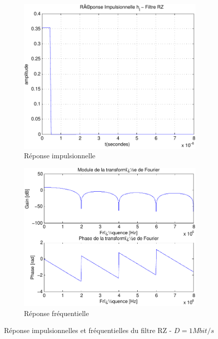 \documentclass[a4paper,11pt]{article}
\begin{document}
\begin{figure}
	\begin{subfigure}{.5\textwidth}
  		\centering
  		\includegraphics[width=1\linewidth]{impul_rz-crop.pdf}
  		\caption{Réponse impulsionnelle}
  		\label{fig:rz_impul1M}
	\end{subfigure}
	\begin{subfigure}{.5\textwidth}
  		\centering
  		\includegraphics[width=1\linewidth]{frec_rz-crop.pdf}
  		\caption{Réponse fréquentielle}
  		\label{fig:rz_frec1M}
	\end{subfigure}%
	\caption{Réponse impulsionnelles et fréquentielles du filtre RZ - $D=1 Mbit/s$}
	\label{fig:rz1M}
\end{figure}
\end{document}
